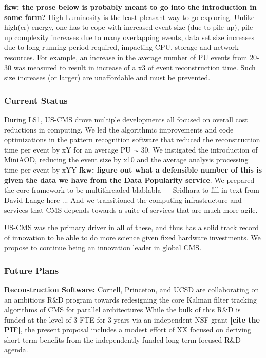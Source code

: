 \documentclass[11pt,a4paper]{article}
\begin{document}
{\bf fkw: the prose below is probably meant to go into the introduction in some form?} 
High-Luminosity is the least
pleasant way to go exploring. Unlike high(er) energy, one has to cope
with increased event size (due to pile-up), pile-up complexity
increases due to many overlapping events, data set size increases due
to long running period required, impacting CPU, storage and network
resources.  For example, an increase in the average number of PU events from 20-30
was measured to result in increase of a x3 of event reconstruction
time. Such size increases (or larger) are unaffordable and must be
prevented.

\subsubsection{Current Status}

During LS1, US-CMS drove multiple developments all focused on overall cost reductions in computing.
We led the algorithmic improvements and code optimizations in the pattern recognition software that reduced the reconstruction
time per event by xY for an average PU $\sim$ 30. We instigated the introduction of MiniAOD, reducing the event size by x10
and the average analysis processing time per event by xYY {\bf fkw: figure out what a defensible number of this is given the data we have
from the Data Popularity service}. 
We prepared the core framework to be multithreaded blablabla --- Sridhara to fill in text from David Lange here ... 
And we transitioned the computing infrastructure and services that CMS depends towards a suite of services that are much more agile.

US-CMS was the primary driver in all of these, and thus has a solid track record of innovation to be able to do more science
given fixed hardware investments. We propose to continue being an innovation leader in global CMS. 

\subsubsection{Future Plans}

{\bf Reconstruction Software:}
Cornell, Princeton, and UCSD are collaborating on an ambitious R\&D program towards redesigning the core Kalman filter tracking algorithms of CMS for parallel architectures While the bulk of this R\&D is funded at the level of 3 FTE for 3 years
via an independent NSF grant {\bf [cite the PIF]}, the present proposal includes a modest effort of XX focused on deriving short term
benefits from the independently funded long term focused R\&D agenda.
\end{document}
